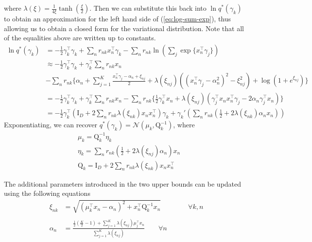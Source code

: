 \documentclass[twoside,11pt]{article}
\newcommand{\tr}{\intercal}
\newcommand{\eye}{\mathrm{I}}
\begin{document}
where $\lambda(\xi) = \frac{1}{4\xi} \tanh \left( \frac{\xi}{2} \right)$. Then we can substitute this back into $\ln q^{*}(\gamma_k)$ to obtain an approximation for the left hand side of (\ref{eq:log-sum-exp}), thus allowing us to obtain a closed form for the variational distribution. Note that all of the equalities above are written up to constants.
\begin{align*}
    \ln q^{*}(\gamma_k) &= - \frac{1}{2} \gamma_k^{\tr} \gamma_k + \sum_{n} r_{nk} x_n^{\intercal} \gamma_k  - \sum_n r_{nk} \ln \left( \sum_j \exp\{x_n^{\intercal} \gamma_j \} \right)  \\
    & \approx - \frac{1}{2} \gamma_k^{\tr} \gamma_k + \gamma_k^{\intercal} \sum_{n} r_{nk} x_n \\
    & - \sum_n r_{nk} \Bigg\{ \alpha_n + \sum_{j = 1}^K \frac{x_n^{\intercal} \gamma_j - \alpha_n + \xi_{nj}}{2} + \lambda(\xi_{nj}) \left( (x_n^{\intercal} \gamma_j - \alpha_n^2)^2 - \xi_{nj}^2\right) + \log \left( 1 + e^{\xi_{nj}}\right) \Bigg\} \\
    & = - \frac{1}{2} \gamma_k^{\tr} \gamma_k + \gamma_k^{\intercal} \sum_{n} r_{nk} x_n - \sum_n r_{nk} \Bigg\{ \frac{1}{2} \gamma_k^{\tr} x_n + \lambda\left( \xi_{nj} \right) \left( \gamma_j^{\tr}x_n x_n^{\tr} \gamma_j - 2\alpha_n \gamma_j^{\tr} x_n \right)\Bigg\} \\
    &= -\frac{1}{2} \gamma_k^{\tr} \left(\eye_D  + 2 \sum_n r_{nk} \lambda(\xi_{nk}) x_n x_n^{\tr} \right) \gamma_k + \gamma_k' \left( \sum_n r_{nk} \left(\frac{1}{2} + 2 \lambda \left( \xi_{nk}\right) \alpha_n  x_n\right) \right)
\end{align*}
Exponentiating, we can recover $q^{*}(\gamma_k) = \mathcal{N} \left( \mu_k, \mathrm{Q}_k^{-1} \right)$, where
\begin{equation} \label{eq:gamma_params}
\begin{split}
	& \mu_k = \mathrm{Q}_k^{-1} \eta_k \\
	& \eta_k = \sum_{n} r_{nk} \left( \frac{1}{2} + 2 \lambda(\xi_{nj}) \alpha_n \right) x_n \\
	& \mathrm{Q}_k = \eye_D + 2 \sum_{n} r_{nk} \lambda(\xi_{nk}) x_n x_n^{\tr}
\end{split}
\end{equation}

The additional parameters introduced in the two upper bounds can be updated using the following equations
\begin{align*}
    \xi_{nk} & = \sqrt{\left(\mu_k^{\intercal}x_n - \alpha_n \right)^2 + x_n^{\intercal} \mathrm{Q}_k^{-1} x_n} \qquad \qquad \forall k, n \\ \\
    \alpha_n & = \frac{\frac{1}{2}\left( \frac{K}{2} - 1\right) + \sum_{j = 1}^K \lambda \left( \xi_{nj} \right)\mu_j^{\intercal} x_n}{\sum_{j=1}^{K} \lambda \left( \xi_{nj}\right)} \qquad \forall n
\end{align*}
\end{document}
